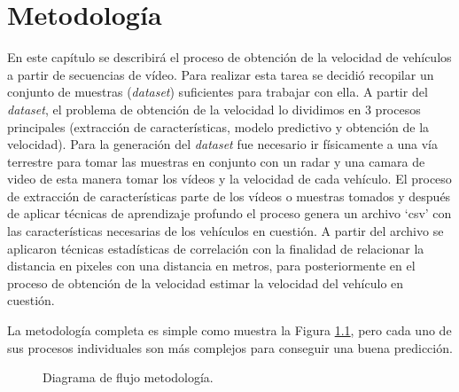 \chapter{Metodología}
\label{cap:metodologia}

En este capítulo se describirá el proceso de obtención de la velocidad de vehículos a partir de secuencias de vídeo. Para realizar esta tarea se decidió recopilar un conjunto de muestras (\textit{dataset}) suficientes para trabajar con ella.  A partir del \textit{dataset}, el problema de obtención de la velocidad lo dividimos en 3 procesos principales (extracción de características, modelo predictivo y obtención de la velocidad). Para la generación del \textit{dataset} fue necesario ir físicamente a una vía terrestre para tomar las muestras en conjunto con un radar y una camara de video de esta manera tomar los vídeos y la velocidad de cada vehículo. El proceso de extracción de características parte de los vídeos o muestras tomados y después de aplicar técnicas de aprendizaje profundo el proceso genera un archivo \enquote*{csv} con las características necesarias de los vehículos en cuestión. A partir del archivo se aplicaron técnicas estadísticas de correlación con la finalidad de relacionar la distancia en pixeles con una distancia en metros, para posteriormente en el proceso de obtención de la velocidad estimar la velocidad del vehículo en cuestión. 


La metodología completa es simple como muestra la Figura \ref{fig:MetodologiaDF}, pero cada uno de sus procesos individuales son más complejos para conseguir una buena predicción.


\begin{figure}[H]

    \centering
    \caption{Diagrama de flujo metodología.}
    \label{fig:MetodologiaDF}

\end{figure}






